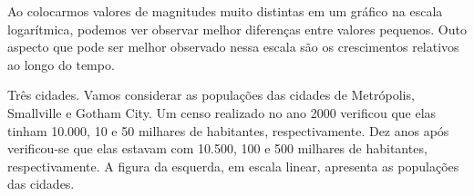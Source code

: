 
Ao colocarmos valores de magnitudes muito distintas em um gráfico na escala logarítmica, podemos ver observar melhor diferenças entre valores pequenos. Outo aspecto que pode ser melhor observado nessa escala são os crescimentos relativos ao longo do tempo.


\begin{task}{Três cidades.}
Vamos considerar as populações das cidades de Metrópolis, Smallville e Gotham City. Um censo realizado no ano 2000 verificou que elas tinham 10.000, 10 e 50 milhares de habitantes, respectivamente. Dez anos após verificou-se que elas estavam com 10.500, 100 e 500 milhares de habitantes, respectivamente. A figura da esquerda, em escala linear, apresenta as populações das cidades.



\end{task}
